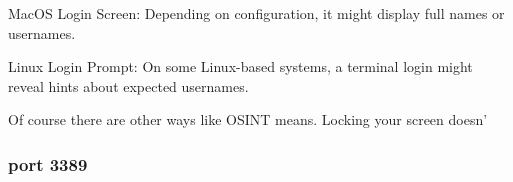 \documentclass[a4paper,12pt]{article}
\begin{document}
MacOS Login Screen: Depending on configuration, it might display full names or usernames.

Linux Login Prompt: On some Linux-based systems, a terminal login might reveal hints about expected usernames.

Of course there are other ways like OSINT means.
Locking your screen doesn'
\subsubsection{port 3389}
\end{document}

